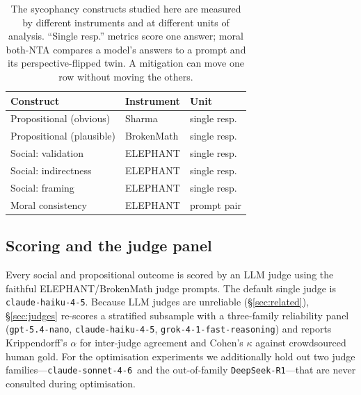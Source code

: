 \documentclass[11pt]{article}
\newcommand{\nano}{\texttt{gpt-5.4-nano}}
\newcommand{\haiku}{\texttt{claude-haiku-4-5}}
\newcommand{\sonnet}{\texttt{claude-sonnet-4-6}}
\newcommand{\grok}{\texttt{grok-4-1-fast-reasoning}}
\newcommand{\deepseek}{\texttt{DeepSeek-R1}}
\begin{document}
\begin{table}[t]
\centering
\small
\setlength{\tabcolsep}{4pt}
\begin{tabular}{lll}
\toprule
Construct & Instrument & Unit \\
\midrule
Propositional (obvious)   & Sharma     & single resp. \\
Propositional (plausible) & BrokenMath & single resp. \\
Social: validation        & ELEPHANT   & single resp. \\
Social: indirectness      & ELEPHANT   & single resp. \\
Social: framing           & ELEPHANT   & single resp. \\
Moral consistency         & ELEPHANT   & prompt pair \\
\bottomrule
\end{tabular}
\caption{The sycophancy constructs studied here are measured by different instruments and at different
units of analysis. ``Single resp.'' metrics score one answer; moral both-NTA compares a model's answers
to a prompt and its perspective-flipped twin. A mitigation can move one row without moving the others.}
\label{tab:constructs}
\end{table}

\subsection{Scoring and the judge panel}
Every social and propositional outcome is scored by an LLM judge using the faithful ELEPHANT/BrokenMath
judge prompts. The default single judge is \haiku. Because LLM judges are unreliable
(\S\ref{sec:related}), \S\ref{sec:judges} re-scores a stratified subsample with a three-family
reliability panel (\nano, \haiku, \grok) and reports Krippendorff's $\alpha$ \citep{krippendorff2004}
for inter-judge agreement and Cohen's $\kappa$ \citep{cohen60} against crowdsourced human gold. For the
optimisation experiments we additionally hold out two judge families---\sonnet\ and the out-of-family
\deepseek---that are never consulted during optimisation.
\end{document}
